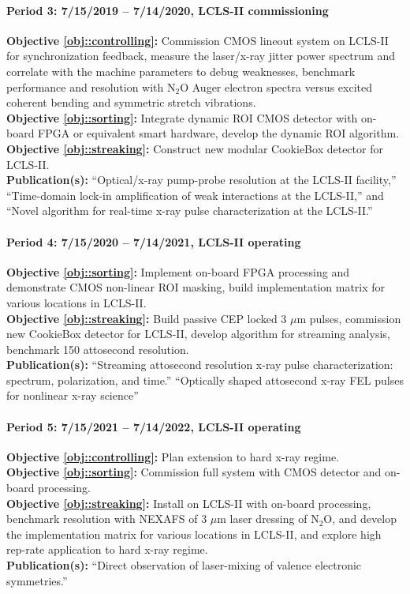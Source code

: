 \documentclass[letterpaper,oneside,11pt]{article}
\begin{document}
\paragraph*{Period 3: 7/15/2019 -- 7/14/2020, LCLS-II commissioning\\}
\textbf{Objective \ref{obj::controlling}: } 
Commission CMOS lineout system on LCLS-II for synchronization feedback, measure the laser/x-ray jitter power spectrum and correlate with the machine parameters to debug weaknesses, benchmark performance and resolution with N$_2$O Auger electron spectra versus excited coherent bending and symmetric stretch vibrations.\\
\textbf{Objective \ref{obj::sorting}: }
Integrate dynamic ROI CMOS detector with on-board FPGA or equivalent smart hardware, develop the dynamic ROI algorithm.\\
\textbf{Objective \ref{obj::streaking}: }
Construct new modular CookieBox detector for LCLS-II.\\
\textbf{Publication(s): }
``Optical/x-ray pump-probe resolution at the LCLS-II facility,'' ``Time-domain lock-in amplification of weak interactions at the LCLS-II,'' and ``Novel algorithm for real-time x-ray pulse characterization at the LCLS-II.''

\paragraph*{Period 4: 7/15/2020 -- 7/14/2021, LCLS-II operating\\}
\textbf{Objective \ref{obj::sorting}: }
Implement on-board FPGA processing and demonstrate CMOS non-linear ROI masking, build implementation matrix for various locations in LCLS-II.\\
\textbf{Objective \ref{obj::streaking}: }
Build passive CEP locked 3 $\mu$m pulses, commission new CookieBox detector for LCLS-II, develop algorithm for streaming analysis, benchmark 150 attosecond resolution.\\
\textbf{Publication(s): }
``Streaming attosecond resolution x-ray pulse characterization: spectrum, polarization, and time.''
``Optically shaped attosecond x-ray FEL pulses for nonlinear x-ray science''

\paragraph*{Period 5: 7/15/2021 -- 7/14/2022, LCLS-II operating\\}
\textbf{Objective \ref{obj::controlling}: }
Plan extension to hard x-ray regime.\\
\textbf{Objective \ref{obj::sorting}: }
Commission full system with CMOS detector and on-board processing.\\
\textbf{Objective \ref{obj::streaking}: }
Install on LCLS-II with on-board processing, benchmark resolution with NEXAFS of 3 $\mu$m laser dressing of N$_2$O, and develop the implementation matrix for various locations in LCLS-II, and explore high rep-rate application to hard x-ray regime.\\
\textbf{Publication(s): }
``Direct observation of laser-mixing of valence electronic symmetries.''
\end{document}
